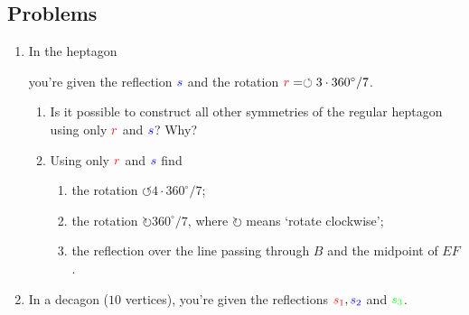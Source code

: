\documentclass[a4paper,11pt]{article}
\newcommand{\clr}{\textcolor{red}}
\newcommand{\clb}{\textcolor{blue}}
\newcommand{\clg}{\textcolor{green}}
\begin{document}
\subsection*{Problems}
\begin{enumerate}
 \item In the heptagon
 \begin{center}
 \end{center}
 you're given the reflection $\clb{s}$ and the rotation $\clr{r} =
 \circlearrowleft 3 \cdot 360^{ \circ } / 7$.
 \begin{enumerate}
  \item Is it possible to construct all other symmetries of the regular heptagon
   using only $\clr{r}$ and $\clb{s}$? Why?
  \item Using only $\clr{r}$ and $\clb{s}$ find
  \begin{enumerate}
   \item the rotation $\circlearrowleft 4 \cdot 360^{ \circ } / 7$;
   \item the rotation $\circlearrowright 360^{ \circ } / 7$, where
    $\circlearrowright$ means `rotate clockwise';
   \item the reflection over the line passing through $B$ and the midpoint of
    $EF$.
  \end{enumerate}
 \end{enumerate}
 \item In a decagon ($10$ vertices), you're given the reflections $\clr{s_1},
  \clb{s_2}$ and $\clg{s_3}$.
 \begin{center}
\end{center}
\end{enumerate}
\end{document}
